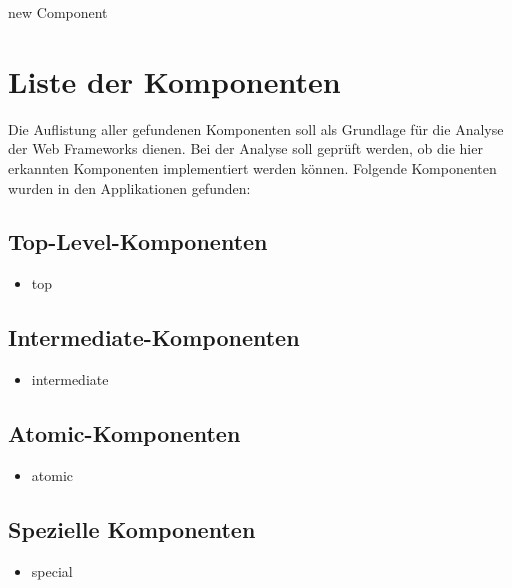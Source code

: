   \begin{description}
    \item[new Component]
  \end{description}
  
  \section{Liste der Komponenten}
  
  Die Auflistung aller gefundenen Komponenten soll als Grundlage für die Analyse
  der Web Frameworks dienen. Bei der Analyse soll geprüft werden, ob die hier
  erkannten Komponenten implementiert werden können. Folgende Komponenten
  wurden in den Applikationen gefunden:
  
  \subsection{Top-Level-Komponenten}
  
  \begin{itemize}
    \item top
  \end{itemize}
  
  \subsection{Intermediate-Komponenten}
  
  \begin{itemize}
    \item intermediate
  \end{itemize}
  
  \subsection{Atomic-Komponenten}
  
  \begin{itemize}
    \item atomic
  \end{itemize}
  
  \subsection{Spezielle Komponenten}
  
  \begin{itemize}
    \item special
  \end{itemize}
  
